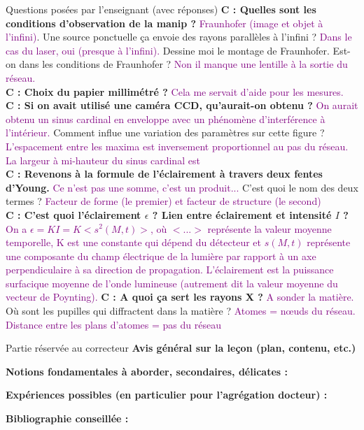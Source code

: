 \begin{reportBlock}{Questions posées par l’enseignant (avec réponses)}
  \textbf{C : Quelles sont les conditions d'observation de la manip ?}  \textcolor{purple}{Fraunhofer (image et objet à l'infini)}. Une source ponctuelle ça envoie des rayons parallèles à l'infini ? \textcolor{purple}{Dans le cas du laser, oui (presque à l'infini).} Dessine moi le montage de Fraunhofer. Est-on dans les conditions de Fraunhofer ? \textcolor{purple}{Non il manque une lentille à la sortie du réseau.}\\
  \textbf{C : Choix du papier millimétré ?}  \textcolor{purple}{Cela me servait d'aide pour les mesures.}\\
   \textbf{C : Si on avait utilisé une caméra CCD, qu'aurait-on obtenu ?}  \textcolor{purple}{On aurait obtenu un sinus cardinal en enveloppe avec un phénomène d'interférence à l'intérieur.} Comment influe une variation des paramètres sur cette figure ? \textcolor{purple}{L'espacement entre les maxima est inversement proportionnel au pas du réseau. La largeur à mi-hauteur du sinus cardinal est } \\
   \textbf{C : Revenons à la formule de l'éclairement à travers deux fentes d'Young.}  \textcolor{purple}{Ce n'est pas une somme, c'est un produit...} C'est quoi le nom des deux termes ? \textcolor{purple}{Facteur de forme (le premier) et facteur de structure (le second)}\\
   \textbf{C : C'est quoi l'éclairement $\epsilon$ ? Lien entre éclairement et intensité $I$ ?}  \textcolor{purple}{On a $\epsilon = KI = K<s^2(M,t)>$, où $<...>$ représente la valeur moyenne temporelle, K est une constante qui dépend du détecteur et $s(M,t)$ représente une composante du champ électrique de la lumière par rapport à un axe perpendiculaire à sa direction de propagation. L'éclairement est la puissance surfacique moyenne de l'onde lumineuse (autrement dit la valeur moyenne du vecteur de Poynting).}
   \textbf{C : A quoi ça sert les rayons X ?}  \textcolor{purple}{A sonder la matière.} Où sont les pupilles qui diffractent dans la matière ? \textcolor{purple}{Atomes = n\oe uds du réseau. Distance entre les plans d'atomes = pas du réseau}
\end{reportBlock}

\begin{reportBlock}{Partie réservée au correcteur}
  \textbf{Avis général sur la leçon (plan, contenu, etc.)}
  
  
  \textbf{Notions fondamentales à aborder, secondaires, délicates :}
  
  
  
  \textbf{Expériences possibles (en particulier pour l'agrégation docteur) :}
  
  
  \textbf{Bibliographie conseillée : }

\end{reportBlock}